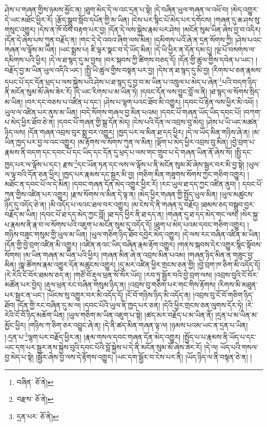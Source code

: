ཤེས་པ་གཞན་གྱིས་ཉམས་མྱོང་ན། །ཐུག་མེད་དེ་ལ་འང་དྲན་པ་སྟེ། །དེ་བཞིན་ཡུལ་གཞན་ལ་འཕོ་བ། །མེད་འགྱུར་དེ་ཡང་མཐོང་ཕྱིར་རོ། །རྩོད་སྒྲུབ་སློབ་དཔོན་གྱི་མ་ཡིན། །ངེས་པར་སྙིང་པོ་མེད་པར་དགོངས། །གཞན་དུ་ཆ་ཤས་སུ་གསུང་འགྱུར། །དེས་ན་ཁོ་བོས་བརྟག་པར་བྱ། །དོན་དེ་ལས་སྐྱེས་རྣམ་པར་ཤེས། །མངོན་སུམ་ཡིན་ཞེས་བྱ་བ་འདིར། །དོན་དེ་ཞེས་པས་ཀུན་བརྗོད་ན། །གང་དེ་དེ་འབའ་ཞིག་ལས་མིན། །དམིགས་པའོ་ཞེ་ན་དྲན་སོགས་ཀྱི། །ཤེས་པའང་གཞན་ལ་ལྟོས་མ་ཡིན། །ཡང་སྨྲས་པ། ཇི་ལྟར་སྣང་བ་དེ་ཡོད་མིན། །དེ་ཡི་ཕྱིར་ན་དོན་དམ་དུ། །ལྔ་པོ་བསགས་ལ་དམིགས་པའི་ཕྱིར། །དེ་ལ་ཐ་སྙད་དུ་མ་བྱས། །བར་སྐབས་ཀྱི་ཚིགས་བཅད་དོ། །དོན་གྱི་ཚུལ་གྱིས་དབེན་པ་ཡང་། །བརྗོད་བྱ་མ་ཡིན་ཡུལ་འདིའི་ཡང་། །སྤྱི་ཡི་ཚུལ་གྱིས་བསྟན་པར་བྱ། །དེས་ན་ཐ་སྙད་དུ་མི་བྱ། །རིགས་པ་ཅན་རྣམས་དཔང་པོ་དང་དོན་ཕྲད་པ་ལས་སྐྱེས་པའི་ཤེས་པ་ཐ་སྙད་དུ་བྱ་བ་མ་ཡིན་པ་འཁྲུལ་པ་མེད་པ་ཞེན་\footnote{བཞིན་  ཅོ་ནེ། }པའི་བདག་ཉིད་ནི་མངོན་སུམ་མོ་ཞེས་ཟེར་རོ། །དེ་ཡང་རིགས་པ་མ་ཡིན་ཏེ། །དབང་དོན་ལས་བྱུང་བློ་ལ་ནི། །ཐ་སྙད་ལ་སོགས་སྲིད་མ་ཡིན། །བར་དང་བཅས་པ་འཛིན་པ་དང་། །ཤེས་པ་ལྷག་པའང་ཐོབ་མི་འགྱུར། །དབང་པོ་རྟེན་ལས་ཕྱིར་མི་འཕོ། །ཡུལ་ལ་འཛིན་པར་ནུས་མ་ཡིན། །བདེ་སོགས་གཞལ་བྱ་མིན་པའམ། །དབང་པོ་གཞན་ཡོད་ཡིད་དབང་པོ། །བཀག་པ་མེད་ཕྱིར་ཐོབ་ཅེ་ན། །དབང་པོ་གཞན་གྱི་སྒྲ་དོན་མེད། །ངེས་པའི་དོན་ལ་འབྲས་བུ་མེད། །ཤེས་པ་ཡི་ཡང་མཚན་ཉིད་ལས། །དོན་གཞན་འབྲས་བུར་སྨྲ་བར་འགྱུར། །ཁྱད་པར་ལ་མིན་ཐ་དད་ཕྱིར། །དེ་ལ་ཡོད་མིན་གཉིས་ཞེ་ན། །མ་ཡིན་ཁྱད་པར་བྱ་ལ་འང་འགྱུར། །མ་རྟོགས་ལ་སོགས་ཀུན་ལ་མིན། །ལྡོག་པ་མེད་ཕྱིར་འབྲས་བུ་མིན། །བྱེ་བྲག་པ་རྣམས་ནི་བདག་དང་དབང་པོ་དང་ཡིད་དང་དོན་དུ་ཕྲད་པ་ལས་གང་གྲུབ་པ་དེ་གཞན་ཡིན་ནོ་ཞེས་སོ། །སྤྱི་དང་ཁྱད་པར་ལ་ལྟོས་པ་དང་། རྫས་\footnote{བརྫས་  ཅོ་ནེ། }དང་ཡོན་ཏན་དང་ལས་ལ་ལྟོས་པ་ནི་མངོན་སུམ་མོ་ཞེས་སྦྱར་བར་མི་བྱ་སྟེ། །ཡུལ་ལ་ལྟ་བའི་དོན་ཅན་ཕྱིར། །ཁྱད་པར་རྣམས་དང་སྦྱར་མི་བྱ། །གཅིག་མིན་གཟུགས་སོགས་ཀྱང་གཅིག་འགྱུར། །མཐོང་ན་དབང་པོ་ལ་དེ་མིན། །དབང་གཞན་དོན་མེད་འགྱུར་ཕྱིར་རོ། །རང་ཡུལ་ཐ་དད་ཀྱང་འཛིན་ནུབ། །
དབང་པོ་ཀུན་གྱིས་འཛིན་པར་འགྱུར། །རྫས་སོགས་ལ་མིན་དེ་ལྟ་ན། །མེད་ཕྱིར་གཞན་གྱི་སྤྱོད་ཡུལ་མིན། །ཡུལ་མཚུངས་ཉིད་དུ་འདོད་ཅེ་ན། །མི་འདོད་པ་ལའང་ཐལ་བར་འགྱུར། །མ་ངེས་དེ་ནི་གཞན་དུ་བརྗོད། །ཐམས་ཅད་བསྒྲུབ་བྱར་བརྗོད་མ་ཡིན། །དབང་པོ་ཐ་དད་མེད་ཀྱང་བློ། །ཐ་དད་ཕྱིར་ནི་ཐ་དད་ན། །གཞན་དུ་ཐ་དད་མེད་གང་ལས། །སེར་སྐྱ་པ་རྣམས་ནི་རྣ་བ་ལ་སོགས་པའི་འཇུག་པ་མངོན་སུམ་དུ་འདོད་དོ། །ཐུག་པ་མེད་པའམ་དབང་གཅིག་འགྱུར། །གཉིས་བཟུང་གསུམ་གྱི་ཡུལ་མ་ཡིན། །ཡུལ་གཅིག་ཉིད་ཐོབ་དབྱེར་མེད་འགྱུར། །དེ་ལས་རང་བཞིན་འཛིན་མ་ཡིན། །དོན་གྱི་བྱེ་བྲག་འཛིན་མི་འགྱུར། །འཛིན་ནའང་ཡིད་བཞིན་རྣམ་རྟོག་འགྱུར། །གནས་སྐབས་དེར་འགྱུར་སྙིང་སྟོབས་སོགས། །མ་ཡིན་གཞན་མ་ཡིན་པའི་ཕྱིར། །གཞན་མིན་ཞེ་ན་འབྲས་མིན་པའམ། །གཞན་ཉིད་མིན་ན་གཟུང་བྱ་མིན། །སྣ་ཚོགས་རྣམ་འགྱུར་དོན་མཚུངས་འགྱུར། །དུ་མར་འཛིན་ཕྱིར་གྲངས་ཅན་གྱི། །བྱེ་བྲག་ཁ་ཅིག་མི་འདོད་དོ། །རེ་རེའི་ངོ་བོར་ཐམས་ཅད་ན། །གཙོ་བོ་རྡུལ་ཕྲན་སོ་སོར་ཡོད། །རབ་ཏུ་སྦྱོར་བའི་བྱེ་བྲག་ལས། །འབྲས་བུའི་ངོ་བོར་མཚོན་པར་བྱེད། །རྡུལ་ཕྲན་རང་བཞིན་གསུམ་ཉིད་ན། །འབྲས་བུ་གཅིག་པར་གང་གིས་རྟོགས། །རིགས་མི་མཐུན་པར་སྦྱར་ན་ཡང་། །ཡོངས་སུ་འགྱུར་བར་མི་འདོད་དོ། །ངོ་བོ་གཉིས་ཉིད་མི་འདོད་ན། །འབྲས་བུ་ངོ་བོ་གཅིག་ཉིད་ཐོབ། །དོན་གྱི་རང་བཞིན་དུ་མ་ལ། །དབང་པོའི་ཡུལ་ནི་ཁྱད་པར་ཅན། །དེའི་ཕྱིར་གྲངས་ཅན་ལུགས་དོར་ཏེ། །རེ་རེའི་ངོ་བོ་ཉིད་མཆོག་ཡིན། །ཡུལ་གཅིག་མ་ཡིན་འཇུག་པ་སྟེ། །ཚད་མར་བརྗོད་པ་མ་ཡིན་ནོ། །དྲན་པ་མ་ཡིན་མ་མྱོང་ཕྱིར། །གཉིས་ཀ་ཅིག་ཅར་འབྱུང་ཞེ་ན། །དེ་ནི་ཚད་མིན་གཞན་ལྟ་ལ། །ཉམས་པའམ་ཡང་ན་དྲན་པ་ཡིན། །:དྲན་པ་\footnote{དྲན་པར་  ཅོ་ནེ། }ལྷག་པར་བརྗོད་ཕྱིར་ན། །རྣམ་གསལ་དབང་གཞན་དོན་མེད་འགྱུར། །སྤྱོད་པ་པ་རྣམས་ནི་ཡོད་པ་དང་ཡང་དག་པར་སྦྱར་ནས་སྐྱེས་བུའི་དབང་པོའི་བློ་སྐྱེས་པ་དེ་ནི་མངོན་སུམ་མོ་ཞེས་ཟེར་རོ། །དེ་ལ། ཡོད་པའི་གསལ་བྱ་མེད་པ་སྟེ། །སྦྱོར་ཞེས་བྱ་ལས་དེ་རྟོགས་འགྱུར། །ཡང་དག་སྦྱོར་བ་ངེས་པར་ནི། །ཡོད་ཉིད་ལ་ནི་བསྟན་ཅེ་ན། །
